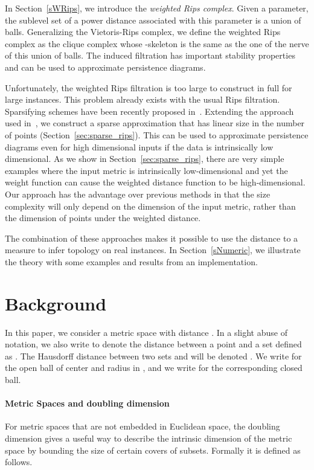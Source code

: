\documentclass[a4paper]{article}
\begin{document}
In Section~\ref{sWRips}, we introduce the \emph{weighted Rips complex}.
Given a parameter, the sublevel set of a power distance associated with this parameter is a union of balls.
Generalizing the Vietoris-Rips complex, we define the weighted Rips complex as the clique complex whose -skeleton is the same as the one of the nerve of this union of balls.
The induced filtration has important stability properties and can be used to approximate  persistence diagrams.


Unfortunately, the weighted Rips filtration is too large to construct in full for large instances.
This problem already exists with the usual Rips filtration.
Sparsifying schemes have been recently proposed in~\cite{ctpsmDFW,lsavrfS}.
Extending the approach used in~\cite{lsavrfS}, we construct a sparse approximation that has linear size in the number of points (Section~\ref{sec:sparse_rips}).
This can be used to approximate persistence diagrams even for high dimensional inputs if the data is intrinsically low dimensional.
As we show in Section~\ref{sec:sparse_rips}, there are very simple examples where the input metric is intrinsically low-dimensional and yet the weight function can cause the weighted distance function to be high-dimensional.  
Our approach has the advantage over previous methods in that the size complexity will only depend on the dimension of the input metric, rather than the dimension of points under the weighted distance.

The combination of these approaches makes it possible to use the distance to a measure to infer topology on real instances.
In Section~\ref{sNumeric}, we illustrate the theory with some examples and results from an implementation.








\section{Background} In this paper, we consider a metric space  with distance .
In a slight abuse of notation, we also write  to denote the distance between a point and a set defined as .
The Hausdorff distance between two sets  and  will be denoted .
We write  for the open ball of center  and radius  in , and we write  for the corresponding closed ball.

\paragraph{Metric Spaces and doubling dimension}
For metric spaces that are not embedded in Euclidean space, the doubling dimension gives a useful way to describe the intrinsic dimension of the metric space by bounding the size of certain covers of subsets.
Formally it is defined as follows.
\end{document}
